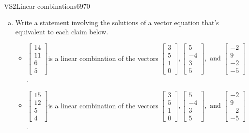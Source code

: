 \begin{exercise}{VS2}{Linear combinations}{6970} 
\begin{exerciseStatement} 

\begin{enumerate}[(a)]
\item  

 Write a statement involving the solutions of a vector equation that's equivalent to each claim below. 

 

\begin{itemize}
\item  

 \(\left[\begin{array}{c}
14 \\
11 \\
6 \\
5
\end{array}\right]\)is a linear combination of the vectors \(\left[\begin{array}{c}
3 \\
5 \\
1 \\
0
\end{array}\right] , \left[\begin{array}{c}
5 \\
-4 \\
3 \\
5
\end{array}\right] , \text{ and } \left[\begin{array}{c}
-2 \\
9 \\
-2 \\
-5
\end{array}\right]\). 

 
\item  

 \(\left[\begin{array}{c}
15 \\
12 \\
5 \\
4
\end{array}\right]\)is a linear combination of the vectors \(\left[\begin{array}{c}
3 \\
5 \\
1 \\
0
\end{array}\right] , \left[\begin{array}{c}
5 \\
-4 \\
3 \\
5
\end{array}\right] , \text{ and } \left[\begin{array}{c}
-2 \\
9 \\
-2 \\
-5
\end{array}\right]\). 


\end{itemize}
\end{enumerate}
\end{exerciseStatement}
\end{exercise}
